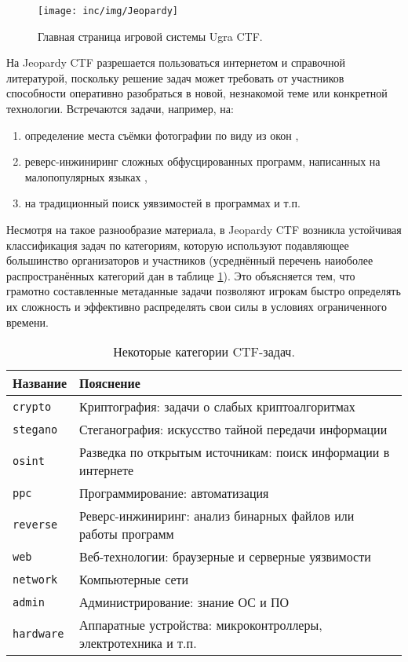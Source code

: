 
\begin{figure}[h]
  \centering
  \texttt{[image: inc/img/Jeopardy]}
  \caption{Главная страница игровой системы Ugra CTF.}
  \label{fig:Jeopardy}
\end{figure}

На Jeopardy CTF разрешается пользоваться интернетом и справочной литературой, поскольку решение задач может требовать от участников способности оперативно разобраться в новой, незнакомой теме или конкретной технологии. Встречаются задачи, например, на:
\begin{enumerate}
\item определение места съёмки фотографии по виду из окон \cite{BigcitylightsTask},
\item реверс-инжиниринг сложных обфусцированных программ, написанных на малопопулярных языках \cite{ReverseTask},
\item на традиционный поиск уявзимостей в программах \cite{WebTask} и т.п.
\end{enumerate}

Несмотря на такое разнообразие материала, в Jeopardy CTF возникла устойчивая классификация задач по категориям, которую используют подавляющее большинство организаторов и участников (усреднённый перечень наиоболее распространённых категорий дан в таблице \ref{tab:categories}). Это объясняется тем, что грамотно составленные метаданные задачи позволяют игрокам быстро определять их сложность и эффективно распределять свои силы в условиях ограниченного времени.

\begin{longtable}{|p{}|p{}|}
    \caption{Некоторые категории CTF-задач.}
    \label{tab:categories}
    \\ \hline
    \textbf{Название} & \textbf{Пояснение}
    \\ \hline \endhead
    \texttt{crypto}   & Криптография: задачи о слабых криптоалгоритмах \\
    \texttt{stegano}  & Стеганография: искусство тайной передачи информации \\
    \texttt{osint}    & Разведка по открытым источникам: поиск информации в интернете \\
    \texttt{ppc}      & Программирование: автоматизация \\
    \texttt{reverse}  & Реверс-инжиниринг: анализ бинарных файлов или работы программ \\
    \texttt{web}      & Веб-технологии: браузерные и серверные уязвимости \\
    \texttt{network}  & Компьютерные сети \\
    \texttt{admin}    & Администрирование: знание ОС и ПО \\
    \texttt{hardware} & Аппаратные устройства: микроконтроллеры, электротехника и т.п. \\
    \hline
\end{longtable}

